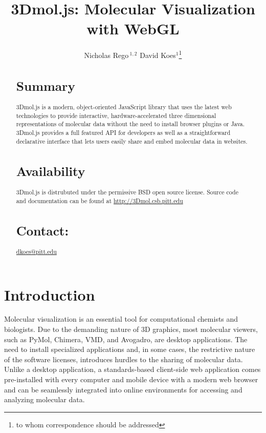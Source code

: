 \documentclass[]{bioinfo}
\begin{document}

\title[3Dmol.js: Molecular Visualization with WebGL]{3Dmol.js: Molecular Visualization with WebGL}
\author[Rego and Koes]{Nicholas Rego\,$^{1,2}$ David Koes$^{1}$\footnote{to whom correspondence should be addressed}}
\address{$^{1}$Department of Computational and Systems Biology, University of Pittsburgh, Pittsburgh, PA 15260\\
$^{2}$Department of XXXXXXXX, Address XXXX etc.}



\maketitle
\begin{abstract}
\section{Summary} 3Dmol.js is a modern, object-oriented JavaScript library that uses the latest web technologies
to provide interactive, hardware-accelerated three dimensional representations of molecular data without the
need to install browser plugins or Java.  3Dmol.js provides a full featured API for developers as well
as a straightforward declarative interface that lets users easily share and embed molecular data in websites.
\section{Availability} 3Dmol.js is distrubuted under the permissive BSD open source license.
Source code and documentation can be found at \url{http://3Dmol.csb.pitt.edu}
\section{Contact:} \href{dkoes@pitt.edu}{dkoes@pitt.edu}
\end{abstract}

\section{Introduction}
Molecular visualization is an essential tool for computational chemists and biologists. Due to the demanding nature of 3D graphics, most molecular viewers, such as PyMol\cite{delano2002pymol}, Chimera\cite{pettersen2004ucsf}, VMD\cite{humphrey1996vmd}, and Avogadro\cite{hanwell2012avogadro}, are desktop applications.  The need to install specialized applications and, in some cases, the restrictive nature of the software licenses, introduces hurdles to the sharing of molecular data.  Unlike a desktop application, a standards-based client-side web application comes pre-installed with every computer and mobile device with a modern web browser and can be seamlessly integrated into online environments for accessing and analyzing molecular data.
\end{document}
